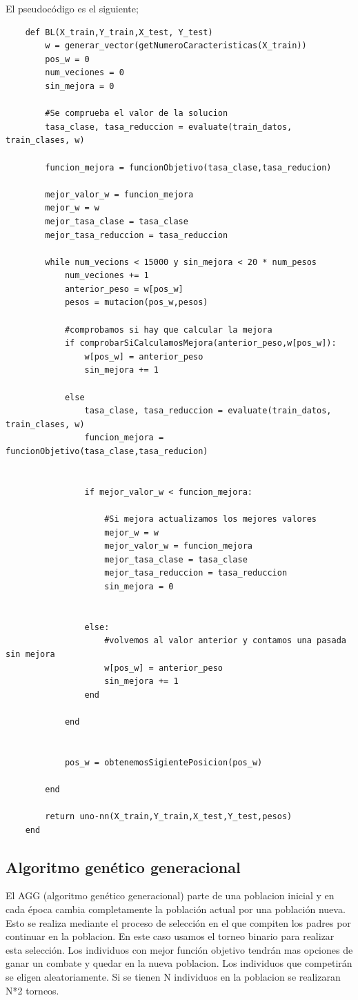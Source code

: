 \documentclass[titlepage]{article}
\begin{document}
	El pseudocódigo es el siguiente;
	\newpage
	\begin{lstlisting}
	def BL(X_train,Y_train,X_test, Y_test)
		w = generar_vector(getNumeroCaracteristicas(X_train))
		pos_w = 0
		num_veciones = 0
		sin_mejora = 0
		
		#Se comprueba el valor de la solucion
		tasa_clase, tasa_reduccion = evaluate(train_datos, train_clases, w)
		
		funcion_mejora = funcionObjetivo(tasa_clase,tasa_reducion)
		
		mejor_valor_w = funcion_mejora
		mejor_w = w
		mejor_tasa_clase = tasa_clase
		mejor_tasa_reduccion = tasa_reduccion
		
		while num_vecions < 15000 y sin_mejora < 20 * num_pesos
			num_veciones += 1
			anterior_peso = w[pos_w]
			pesos = mutacion(pos_w,pesos)
			
			#comprobamos si hay que calcular la mejora
			if comprobarSiCalculamosMejora(anterior_peso,w[pos_w]):
				w[pos_w] = anterior_peso
				sin_mejora += 1	
				
			else
				tasa_clase, tasa_reduccion = evaluate(train_datos, train_clases, w)            
				funcion_mejora = funcionObjetivo(tasa_clase,tasa_reducion)
				
				
				if mejor_valor_w < funcion_mejora:
					
					#Si mejora actualizamos los mejores valores
					mejor_w = w
					mejor_valor_w = funcion_mejora
					mejor_tasa_clase = tasa_clase
					mejor_tasa_reduccion = tasa_reduccion
					sin_mejora = 0
				
				
				else:
					#volvemos al valor anterior y contamos una pasada sin mejora
					w[pos_w] = anterior_peso
					sin_mejora += 1
				end
			
			end
			
			
			pos_w = obtenemosSigientePosicion(pos_w)
		
		end
		
		return uno-nn(X_train,Y_train,X_test,Y_test,pesos)
	end
	\end{lstlisting}
	\subsection{Algoritmo genético generacional}
	El AGG (algoritmo genético generacional) parte de una poblacion inicial y en cada época cambia completamente la población actual por una población nueva. Esto se realiza mediante el proceso de selección en el que compiten los padres por continuar en la poblacion. En este caso usamos el torneo binario para realizar esta selección. Los individuos con mejor función objetivo tendrán mas opciones de ganar un combate y quedar en la nueva poblacion. Los individuos que competirán se eligen aleatoriamente. Si se tienen N individuos en la poblacion se realizaran N*2 torneos. 
	
\end{document}

